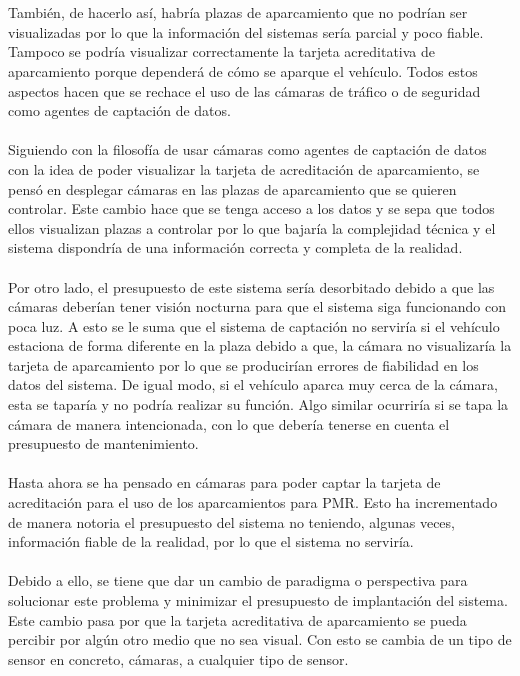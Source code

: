 \\\\
También, de hacerlo así, habría plazas de aparcamiento que no podrían ser visualizadas por lo que la información del sistemas sería parcial y poco fiable. Tampoco se podría visualizar correctamente la tarjeta acreditativa de aparcamiento porque dependerá de cómo se aparque el vehículo. Todos estos aspectos hacen que se rechace el uso de las cámaras de tráfico o de seguridad como agentes de captación de datos.
\\\\
Siguiendo con la filosofía de usar cámaras como agentes de captación de datos con la idea de poder visualizar la tarjeta de acreditación de aparcamiento, se pensó en desplegar cámaras en las plazas de aparcamiento que se quieren controlar. Este cambio hace que se tenga acceso a los datos y se sepa que todos ellos visualizan plazas a controlar por lo que bajaría la complejidad técnica y el sistema dispondría de una información correcta y completa de la realidad.
\\\\
Por otro lado, el presupuesto de este sistema sería desorbitado debido a que las cámaras deberían tener visión nocturna para que el sistema siga funcionando con poca luz. A esto se le suma que el sistema de captación no serviría si el vehículo estaciona de forma diferente en la plaza debido a que, la cámara no visualizaría la tarjeta de aparcamiento por lo que se producirían errores de fiabilidad en los datos del sistema. De igual modo, si el vehículo aparca muy cerca de la cámara, esta se taparía y no podría realizar su función. Algo similar ocurriría si se tapa la cámara de manera intencionada, con lo que debería tenerse en cuenta el presupuesto de mantenimiento.
\\\\
Hasta ahora se ha pensado en cámaras para poder captar la tarjeta de acreditación para el uso de los aparcamientos para PMR. Esto ha incrementado de manera notoria el presupuesto del sistema no teniendo, algunas veces, información fiable de la realidad, por lo que el sistema no serviría.
\\\\
Debido a ello, se tiene que dar un cambio de paradigma o perspectiva para solucionar este problema y minimizar el presupuesto de implantación del sistema. Este cambio pasa por que la tarjeta acreditativa de aparcamiento se pueda percibir por algún otro medio que no sea visual. Con esto se cambia de un tipo de sensor en concreto, cámaras, a cualquier tipo de sensor.
